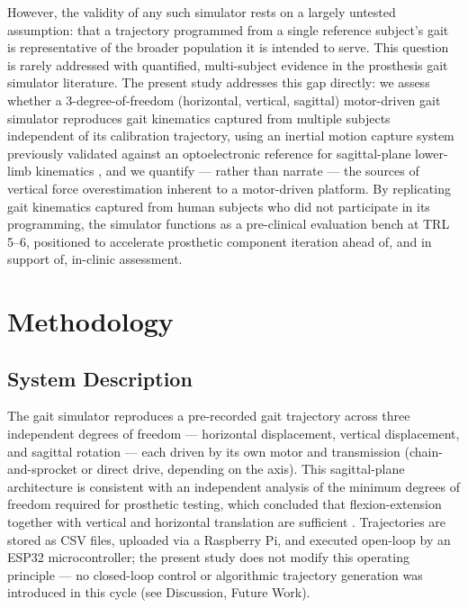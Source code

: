 \documentclass[journal,twocolumn,letterpaper]{IEEEJERM}
\begin{document}
However, the validity of any such simulator rests on a largely untested
assumption: that a trajectory programmed from a single reference
subject's gait is representative of the broader population it is
intended to serve. This question is rarely addressed with quantified,
multi-subject evidence in the prosthesis gait simulator literature. The
present study addresses this gap directly: we assess whether a
3-degree-of-freedom (horizontal, vertical, sagittal) motor-driven gait
simulator reproduces gait kinematics captured from multiple subjects
independent of its calibration trajectory, using an inertial motion
capture system previously validated against an optoelectronic reference
for sagittal-plane lower-limb kinematics
\cite{Piche2022iSenValidity,Rattanakoch2023TranstibialIMU}, and we quantify ---
rather than narrate --- the sources of vertical force overestimation
inherent to a motor-driven platform. By replicating gait kinematics
captured from human subjects who did not participate in its
programming, the simulator functions as a pre-clinical evaluation
bench at TRL 5--6, positioned to accelerate prosthetic component
iteration ahead of, and in support of, in-clinic assessment.

\section{Methodology}

\subsection*{System Description}

The gait simulator reproduces a pre-recorded gait trajectory across
three independent degrees of freedom --- horizontal displacement,
vertical displacement, and sagittal rotation --- each driven by its own
motor and transmission (chain-and-sprocket or direct drive, depending on
the axis). This sagittal-plane architecture is consistent with an
independent analysis of the minimum degrees of freedom required for
prosthetic testing, which concluded that flexion-extension together with
vertical and horizontal translation are sufficient
\cite{Sudeesh2024CompactGaitSimulator}. Trajectories are stored as CSV files, uploaded via a
Raspberry Pi, and executed open-loop by an ESP32 microcontroller; the
present study does not modify this operating principle --- no
closed-loop control or algorithmic trajectory generation was introduced
in this cycle (see Discussion, Future Work). %
\end{document}

